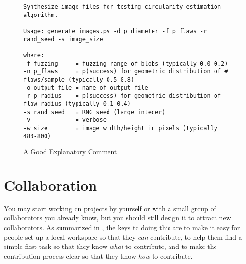 \documentclass[10pt]{article}
\begin{document}
\begin{figure}
\begin{verbatim}
Synthesize image files for testing circularity estimation algorithm.

Usage: generate_images.py -d p_diameter -f p_flaws -r rand_seed -s image_size

where:
-f fuzzing     = fuzzing range of blobs (typically 0.0-0.2)
-n p_flaws     = p(success) for geometric distribution of # flaws/sample (typically 0.5-0.8)
-o output_file = name of output file
-r p_radius    = p(success) for geometric distribution of flaw radius (typically 0.1-0.4)
-s rand_seed   = RNG seed (large integer)
-v             = verbose
-w size        = image width/height in pixels (typically 480-800)
\end{verbatim}
\caption{A Good Explanatory Comment}
\label{fig:comment}
\end{figure}

\section{Collaboration}\label{sec:collaboration}

You may start working on projects by yourself or with a small group of
collaborators you already know, but you should still design it to
attract new collaborators.  As summarized in \cite{steinmacher2015},
the keys to doing this are to make it easy for people set up a local
workspace so that they \emph{can} contribute, to help them find a
simple first task so that they know \emph{what} to contribute, and
to make the contribution process clear so that they know \emph{how}
to contribute.
\end{document}
